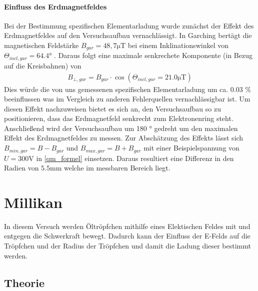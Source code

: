 \documentclass[11pt, a4paper]{article}
\begin{document}
        

    \paragraph{Einfluss des Erdmagnetfeldes}
        Bei der Bestimmung spezifischen Elementarladung wurde zunächst der Effekt des Erdmagnetfeldes auf den Versuchsaufbau
        vernachlässigt. In Garching bertägt die magnetischen Feldstärke $B_{gar} = 48,7 \si{\micro\tesla}$ \cite[]{magnetic_field} bei einem Inklinationswinkel von $\Theta_{incl,gar} = 64.4\si{\degree}$ \cite[]{magnetic_field}. 
        Daraus folgt eine maximale senkrechete Komponente (in Bezug auf die Kreisbahnen) von 
        \begin{align}
        B_{\bot,gar} = B_{gar} \cdot \cos (\Theta_{incl,gar} = 21.0 \si{\micro\tesla})
        \end{align}
        Dies würde die von uns gemessenen spezifischen Elementarladung um ca. 0.03 \% beeinflussen was im Vergleich zu anderen
        Fehlerquellen vernachlässigbar ist. 
        Um diesen Effekt nachzuweisen bietet es sich an, den Versuchsaufbau so zu positionieren, dass das Erdmagnetfeld senkrecht zum Elektronenring steht.
        Anschließend wird der Versuchsaufbau um 180 \si{\degree} gedreht um den maximalen Effekt des Erdmagnetfeldes zu messen.
        Zur Abschätzung des Effekts lässt sich $B_{min,gar} = B - B_{gar}$ und $B_{max,gar} = B + B_{gar}$ mit einer Beispielspannung von $ U = 300 \si{\volt}$ in \ref{qm_formel} einsetzen.
        Daraus resultiert eine Differenz in den Radien von $5.5 \si{\milli\metre}$ welche  im messbaren Bereich liegt.

    

    \section{Millikan}

    In diesem Versuch werden Öltröpfchen mithilfe eines Elektischen Feldes mit und entgegen die Schwerkraft bewegt. Dadurch kann der Einfluss der E-Felds auf die Tröpfchen und der Radius der Tröpfchen und damit die Ladung dieser bestimmt werden.

    \subsection{Theorie}
\end{document}

